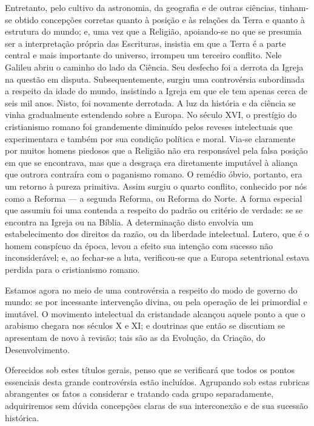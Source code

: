 \documentclass[11pt,a5paper,twoside,openany]{book}
\begin{document}
Entretanto, pelo cultivo da astronomia, da geografia e de outras ciências, tinham-se obtido concepções corretas quanto à posição e às relações da Terra e quanto à estrutura do mundo; e, uma vez que a Religião, apoiando-se no que se presumia ser a interpretação própria das Escrituras, insistia em que a Terra é a parte central e mais importante do universo, irrompeu um terceiro conflito. Nele Galileu abriu o caminho do lado da Ciência. Seu desfecho foi a derrota da Igreja na questão em disputa. Subsequentemente, surgiu uma controvérsia subordinada a respeito da idade do mundo, insistindo a Igreja em que ele tem apenas cerca de seis mil anos. Nisto, foi novamente derrotada. A luz da história e da ciência se vinha gradualmente estendendo sobre a Europa. No século XVI, o prestígio do cristianismo romano foi grandemente diminuído pelos reveses intelectuais que experimentara e também por sua condição política e moral. Via-se claramente por muitos homens piedosos que a Religião não era responsável pela falsa posição em que se encontrava, mas que a desgraça era diretamente imputável à aliança que outrora contraíra com o paganismo romano. O remédio óbvio, portanto, era um retorno à pureza primitiva. Assim surgiu o quarto conflito, conhecido por nós como a Reforma — a segunda Reforma, ou Reforma do Norte. A forma especial que assumiu foi uma contenda a respeito do padrão ou critério de verdade: se se encontra na Igreja ou na Bíblia. A determinação disto envolvia um estabelecimento dos direitos da razão, ou da liberdade intelectual. Lutero, que é o homem conspícuo da época, levou a efeito sua intenção com sucesso não inconsiderável; e, ao fechar-se a luta, verificou-se que a Europa setentrional estava perdida para o cristianismo romano.

Estamos agora no meio de uma controvérsia a respeito do modo de governo do mundo: se por incessante intervenção divina, ou pela operação de lei primordial e imutável. O movimento intelectual da cristandade alcançou aquele ponto a que o arabismo chegara nos séculos X e XI; e doutrinas que então se discutiam se apresentam de novo à revisão; tais são as da Evolução, da Criação, do Desenvolvimento.

Oferecidos sob estes títulos gerais, penso que se verificará que todos os pontos essenciais desta grande controvérsia estão incluídos. Agrupando sob estas rubricas abrangentes os fatos a considerar e tratando cada grupo separadamente, adquiriremos sem dúvida concepções claras de sua interconexão e de sua sucessão histórica.
\end{document}
